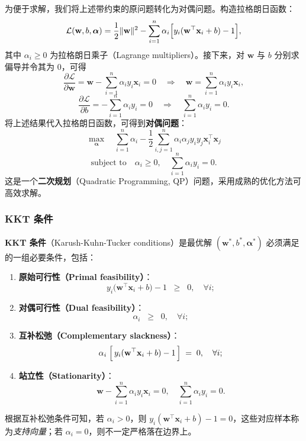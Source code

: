 \documentclass[11pt]{article}
\begin{document}
\begin{CJK}{UTF8}{gbsn}
为便于求解，我们将上述带约束的原问题转化为对偶问题。构造拉格朗日函数：
\[
\mathcal{L}(\mathbf{w}, b, \boldsymbol{\alpha}) 
= \frac{1}{2}\|\mathbf{w}\|^2 
- \sum_{i=1}^n \alpha_i \Bigl[y_i(\mathbf{w}^\top \mathbf{x}_i + b) - 1\Bigr],
\]
其中 \(\alpha_i \ge 0\) 为拉格朗日乘子（Lagrange multipliers）。接下来，对 \(\mathbf{w}\) 与 \(b\) 分别求偏导并令其为 0，可得
\[
\frac{\partial \mathcal{L}}{\partial \mathbf{w}} = \mathbf{w} - \sum_{i=1}^n \alpha_i y_i \mathbf{x}_i = 0
\quad \Longrightarrow \quad 
\mathbf{w} = \sum_{i=1}^n \alpha_i y_i \mathbf{x}_i,
\]
\[
\frac{\partial \mathcal{L}}{\partial b} = -\sum_{i=1}^n \alpha_i y_i = 0
\quad \Longrightarrow \quad 
\sum_{i=1}^n \alpha_i y_i = 0.
\]
将上述结果代入拉格朗日函数，可得到\textbf{对偶问题}：
\[
\max_{\boldsymbol{\alpha}} \quad \sum_{i=1}^n \alpha_i 
- \frac{1}{2}\sum_{i,j=1}^n \alpha_i \alpha_j y_i y_j \mathbf{x}_i^\top \mathbf{x}_j
\]
\[
\text{subject\ to} \quad \alpha_i \ge 0, \quad \sum_{i=1}^n \alpha_i y_i = 0.
\]
这是一个\textbf{二次规划}（Quadratic Programming, QP）问题，采用成熟的优化方法可高效求解。

\subsubsection{KKT 条件}
\label{subsec:kkt}

\textbf{KKT 条件}（Karush-Kuhn-Tucker conditions）是最优解 \((\mathbf{w}^*, b^*, \boldsymbol{\alpha}^*)\) 必须满足的一组必要条件，包括：
\begin{enumerate}
    \item \textbf{原始可行性（Primal feasibility）}：
    \[
    y_i \bigl(\mathbf{w}^\top \mathbf{x}_i + b\bigr) - 1 \;\;\geq\;\; 0,\quad \forall i;
    \]
    \item \textbf{对偶可行性（Dual feasibility）}：
    \[
    \alpha_i \;\;\geq\;\; 0,\quad \forall i;
    \]
    \item \textbf{互补松弛（Complementary slackness）}：
    \[
    \alpha_i\;\Bigl[\,y_i(\mathbf{w}^\top \mathbf{x}_i + b) - 1\,\Bigr] \;=\; 0,\quad \forall i;
    \]
    \item \textbf{站立性（Stationarity）}：
    \[
    \mathbf{w} - \sum_{i=1}^n \alpha_i y_i \mathbf{x}_i = 0,\quad
    \sum_{i=1}^n \alpha_i y_i = 0.
    \]
\end{enumerate}
根据互补松弛条件可知，若 \(\alpha_i>0\)，则 \(y_i(\mathbf{w}^\top \mathbf{x}_i + b) - 1 = 0\)，这些对应样本称为\textit{支持向量}；若 \(\alpha_i=0\)，则不一定严格落在边界上。


\end{CJK}
\end{document}
